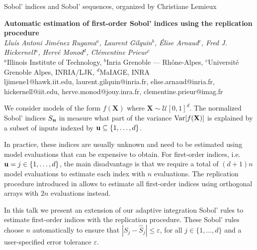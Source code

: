 \documentclass[12pt]{article}
\newcommand{\session}[2]{{\color{red}{\bf In Session:} #2, organized by #1}}
\newcommand{\talktitle}[1]{{\Large\bf #1}\\[12pt]}
\newcommand{\authors}[1]{\emph{#1}\\[8pt]}
\newcommand{\affiliations}[1]{{#1}\\[6pt]}
\newcommand{\contacts}[1]{{#1}\\}
\begin{document}
\session{Christiane Lemieux}{Sobol' indices and Sobol' sequences}

\begin{center}
\vspace*{0.5cm}
%
\talktitle{Automatic estimation of first-order Sobol' indices using the replication procedure}
%
\authors{Llu\'is Antoni Jim\'enez Rugama$^a$, Laurent Gilquin$^b$, \'Elise Arnaud$^c$, Fred J. Hickernell$^a$, Herv\'e Monod$^d$, Cl\'ementine Prieur$^c$}
%
\affiliations{$^a$Illinois Institute of Technology, $^b$Inria Grenoble --- Rh\^one-Alpes, $^c$Universit\'e Grenoble Alpes, INRIA/LJK, $^d$MaIAGE, INRA}
%
\contacts{ljimene1@hawk.iit.edu, laurent.gilquin@inria.fr, elise.arnaud@inria.fr, hickernell@iit.edu, herve.monod@jouy.inra.fr, clementine.prieur@imag.fr}
%
\vspace*{0.3cm}
\end{center}


We consider models of the form $f(\mathbf{X})$ where $\mathbf{X} \sim \mathcal{U} [0,1]^d$. The normalized Sobol' indices $S_{\boldsymbol{\rm u}}$ in \cite{Sob01} measure what part of the variance ${\rm Var}[f(\mathbf{X})]$ is explained by a subset of inputs indexed by $\boldsymbol{\rm u}\subseteq \{1,\dots,d\}$.

In practice, these indices are usually unknown and need to be estimated using model evaluations that can be expensive to obtain. For first-order indices, i.e. ${\boldsymbol{\rm u}}=j\in\{1,\dots,d\}$, the main disadvantage is that we require a total of $(d+1)n$ model evaluations to estimate each index with $n$ evaluations. The replication procedure introduced in \cite{TisPri15} allows to estimate all first-order indices using orthogonal arrays with $2n$ evaluations instead.

In this talk we present an extension of our adaptive integration Sobol' rules \cite{HicJim16a} to estimate first-order indices with the replication procedure. These Sobol' rules choose $n$ automatically to ensure that $|S_j - \widehat{S}_j| \le \varepsilon$, for all $j\in\{1,\dots,d\}$ and a user-specified error tolerance $\varepsilon$.




%
\end{document}
